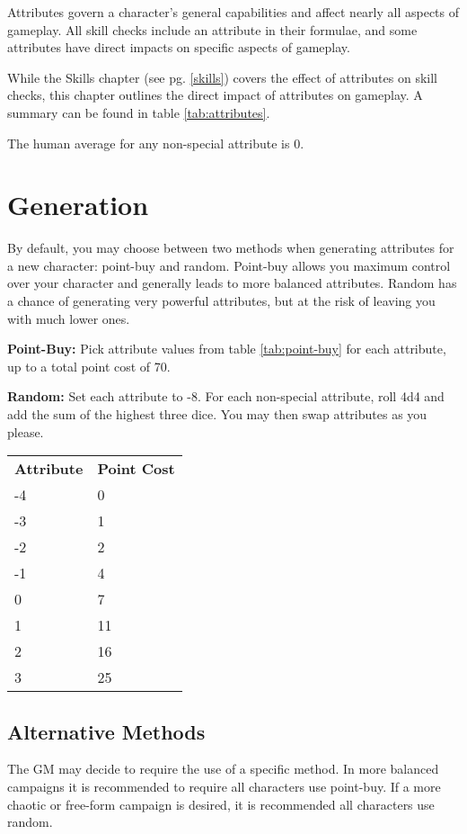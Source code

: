 \begin{multicols*}{2}
    Attributes govern a character's general capabilities and affect nearly all
    aspects of gameplay. All skill checks include an attribute in their formulae,
    and some attributes have direct impacts on specific aspects of gameplay.

    While the Skills chapter (see pg. \ref{skills}) covers the effect of attributes
    on skill checks, this chapter outlines the direct impact of attributes on
    gameplay. A summary can be found in table \ref{tab:attributes}.

    The human average for any non-special attribute is 0.

    \section{Generation}
    By default, you may choose between two methods when generating attributes
    for a new character: point-buy and random. Point-buy allows you maximum
    control over your character and generally leads to more balanced
    attributes. Random has a chance of generating very powerful attributes, but
    at the risk of leaving you with much lower ones.
    
    \textbf{Point-Buy:} Pick attribute values from table \ref{tab:point-buy}
    for each attribute, up to a total point cost of 70.

    \textbf{Random:} Set each attribute to -8. For each non-special attribute,
    roll 4d4 and add the sum of the highest three dice. You may then swap
    attributes as you please.

    {
        \setlength\parindent{0pt}
        \unclassedrowcolors
        \begin{tabularx}{0.5\textwidth}{l X}
            \textbf{Attribute} & \textbf{Point Cost} \\
            -4 & 0 \\
            -3 & 1 \\
            -2 & 2 \\
            -1 & 4 \\
            0 & 7 \\
            1 & 11 \\
            2 & 16 \\
            3 & 25 \\
        \end{tabularx}
        \label{tab:point-buy}
    }

    \subsection{Alternative Methods}
    The GM may decide to require the use of a specific method. In more balanced
    campaigns it is recommended to require all characters use point-buy. If a
    more chaotic or free-form campaign is desired, it is recommended all
    characters use random.


\end{multicols*}
